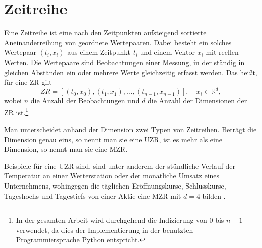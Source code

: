 \section{Zeitreihe}
Eine Zeitreihe ist eine nach den Zeitpunkten aufsteigend sortierte Aneinanderreihung von geordnete Wertepaaren. Dabei besteht ein solches Wertepaar $(t_i, x_i)$ aus einem Zeitpunkt $t_i$ und einem Vektor $x_i$ mit reellen Werten. Die Wertepaare sind Beobachtungen einer Messung, in der ständig in gleichen Abständen ein oder mehrere Werte gleichzeitig erfasst werden. Das heißt, für eine \ac{ZR} gilt 
\[ZR=[(t_0,x_0),(t_1,x_1),\ldots,(t_{n-1},x_{n-1})], \quad x_i \in \mathbb{R}^d,\]
wobei $n$ die Anzahl der Beobachtungen und $d$ die Anzahl der Dimensionen der \acs{ZR} ist.\footnote{In der gesamten Arbeit wird durchgehend die Indizierung von 0 bis $n-1$ verwendet, da dies der Implementierung in der benutzten Programmiersprache Python entspricht.}\label{foot:indexe}

Man unterscheidet anhand der Dimension zwei Typen von Zeitreihen. Beträgt die Dimension genau eins, so nennt man sie eine \ac{UZR}, ist es mehr als eine Dimension, so nennt man sie eine \ac{MZR}.

Beispiele für eine \acs{UZR} sind, sind unter anderem der stündliche Verlauf der Temperatur an einer Wetterstation oder der monatliche Umsatz eines Unternehmens, wohingegen die täglichen Eröffnungskurse, Schlusskurse, Tageshochs und Tagestiefs von einer Aktie eine \acs{MZR} mit $d=4$ bilden \cite[Ch. 3.1]{compressionSurvey}.